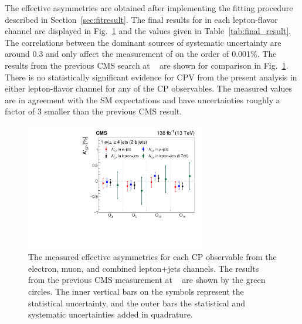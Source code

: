 The effective asymmetries \Acpprime are obtained after implementing the fitting procedure described in Section~\ref{sec:fitresult}.
The final results for \Acpprime in each lepton-flavor channel are displayed in Fig.~\ref{fig:unblind_result} and the values given in Table~\ref{tab:final_result}.
The correlations between the dominant sources of systematic uncertainty are around 0.3 and only affect the measurement of \Acpprime on the order of 0.001\%.
The results from the previous CMS search at \oldTeV~\cite{CPVtop:CMSresult} are shown for comparison in Fig.~\ref{fig:unblind_result}.
There is no statistically significant evidence for CPV from the present analysis in either lepton-flavor channel for any of the CP observables.
The measured \Acpprime values are in agreement with the SM expectations and have uncertainties roughly a factor of 3 smaller than the previous CMS result.

\begin{figure}[!t]
    \centering
    \includegraphics[width=0.7\textwidth]{figure/acp_combined_results.pdf}
    \caption[The measured effective asymmetries \Acpprime for each CP observable.]
    {
        The measured effective asymmetries \Acpprime for each CP observable from the electron, muon, and combined lepton+jets channels.
        The results from the previous CMS measurement at \oldTeV~\cite{CPVtop:CMSresult} are shown by the green circles.
        The inner vertical bars on the symbols represent the statistical uncertainty, and the outer bars the statistical and systematic uncertainties added in quadrature.
    }
    \label{fig:unblind_result}
\end{figure}

